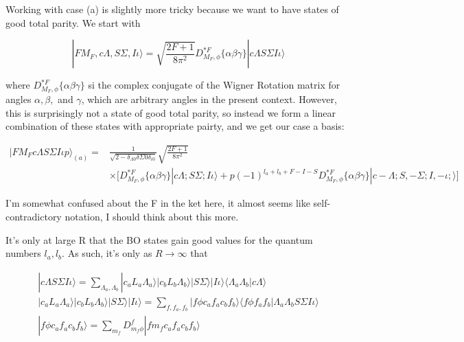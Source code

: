 \documentclass[prl, longbibliography]{revtex4-2}
\begin{document}
Working with case (a) is slightly more tricky because we want to have states of good total parity. We start with

\begin{equation}
|F M_F, c \Lambda, S \Sigma, I \iota\rangle = \sqrt{\frac{2F+1}{8\pi^2}} D_{M_F,\phi}^{* F}\{\alpha \beta \gamma\} |c\Lambda S\Sigma I \iota\rangle
\end{equation}

where $D_{M_F,\phi}^{* F}\{\alpha \beta \gamma\}$ si the complex conjugate of the Wigner Rotation matrix for angles $\alpha, \beta, $ and $\gamma$, which are arbitrary angles in the present context. However, this is surprisingly not a state of good total parity, so instead we form a linear combination of these states with appropriate pairty, and we get our case a basis:

\begin{equation}
\begin{split}
|F M_F c \Lambda S \Sigma I \iota p\rangle_{(a)} = &\frac{1}{\sqrt{2-\delta_{\Lambda 0}\delta{\Sigma 0}\delta_{\iota 0}}} \sqrt{\frac{2F+1}{8\pi^2}}\\
&\times\Bigg[D_{M_F,\phi}^{* F}\{\alpha \beta \gamma\} |c\Lambda ;S\Sigma; I \iota\rangle
+p(-1)^{l_a+l_b+F-I-S}D_{M_F,\phi}^{* F}\{\alpha \beta \gamma\} |c-\Lambda; S,-\Sigma; I, -\iota;\rangle\Bigg]
\end{split}
\end{equation}

I'm somewhat confused about the F in the ket here, it almost seems like self-contradictory notation, I should think about this more. 

It's only at large R that the BO states gain good values for the quantum numbers $l_a, l_b$. As such, it's only as $R\rightarrow\infty$ that

\begin{equation}
\begin{split}
|c\Lambda S \Sigma I \iota\rangle = \sum_{\Lambda_a, \Lambda_b}|c_a L_a \Lambda_a \rangle |c_b L_b \Lambda_b\rangle |S\Sigma\rangle |I\iota\rangle\langle\Lambda_a \Lambda_b|c\Lambda\rangle\\
|c_a L_a\Lambda_a\rangle|c_b L_b \Lambda_b\rangle|S\Sigma\rangle|I\iota\rangle
=\sum_{f,f_a,f_b} |f\phi c_a f_a c_b f_b \rangle \langle f\phi f_a f_b | \Lambda_a \Lambda_b S\Sigma I \iota \rangle
\\
|f\phi c_a f_a c_b f_b\rangle
=\sum_{m_f} D_{m_f\phi}^{f}|f m_f c_a f_a c_b f_b\rangle
\end{split}
\end{equation}
\end{document}
